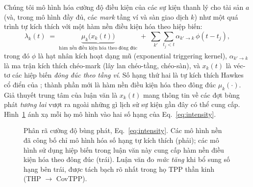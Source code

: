 \documentclass[11pt,a4paper]{article}
\begin{document}
Chúng tôi mô hình hóa cường độ điều kiện của các sự kiện thanh lý cho tài sản $a$ (và, trong mô hình đầy đủ, các \emph{mark} tầng ví và sàn giao dịch $k$) như một quá trình tự kích thích với một hàm nền điều kiện hóa theo hiệp biến:
\begin{equation}
\lambda_k(t) \;=\; \underbrace{\mu_k\!\big(x_k(t)\big)}_{\text{hàm nền điều kiện hóa theo đông đúc}} \;+\; \sum_{k'}\sum_{t_j < t} \alpha_{k'\to k}\,\phi(t - t_j),
\label{eq:intensity}
\end{equation}
trong đó $\phi$ là hạt nhân kích hoạt dạng mũ (exponential triggering kernel), $\alpha_{k'\to k}$ là ma trận kích thích chéo-mark (lây lan chéo-tầng, chéo-sàn), và $x_k(t)$ là véc-tơ các hiệp biến \emph{đông đúc theo tầng ví}. Số hạng thứ hai là tự kích thích Hawkes cổ điển của \citet{bacry2015hawkes}; thành phần mới là hàm nền điều kiện hóa theo đông đúc $\mu_k(\cdot)$. Giả thuyết trung tâm của luận văn là $x_k(t)$ mang thông tin về các đợt bùng phát \emph{tương lai} vượt ra ngoài những gì lịch sử sự kiện gần đây có thể cung cấp. Hình~\ref{fig:intensity} ánh xạ mỗi họ mô hình vào hai số hạng của Eq.~\eqref{eq:intensity}.

\begin{figure}[ht]
\centering
{}
\caption{Phân rã cường độ bùng phát, Eq.~\eqref{eq:intensity}. Các mô hình nền đã công bố chỉ mô hình hóa số hạng tự kích thích (phải); các mô hình sử dụng hiệp biến trong luận văn này cung cấp hàm nền điều kiện hóa theo đông đúc (trái). Luận văn đo \emph{mức tăng} khi bổ sung số hạng bên trái, được tách bạch rõ nhất trong họ TPP thần kinh (THP $\to$ CovTPP).}
\label{fig:intensity}
\end{figure}
\end{document}

